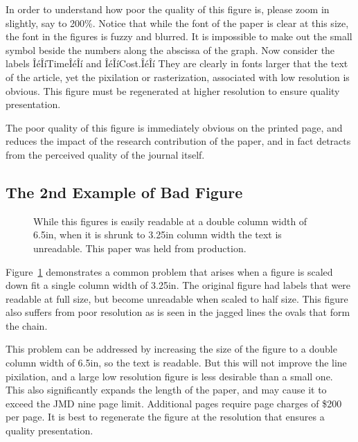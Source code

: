 \documentclass[12pt]{asme2ej}
\begin{document}
    In order to understand how poor the quality of this figure is, please zoom in slightly, say to 200\%. Notice that while the font of the paper is clear at this size, the font in the figures is fuzzy and blurred. It is impossible to make out the small symbol beside the numbers along the abscissa of the graph. Now consider the labels ÎéÎíTimeÎéÎí and ÎéÎíCost.ÎéÎí They are clearly in fonts larger that the text of the article, yet the pixilation or rasterization, associated with low resolution is obvious. This figure must be regenerated at higher resolution to ensure quality presentation.

    The poor quality of this figure is immediately obvious on the printed page, and reduces the impact of the research contribution of the paper, and in fact detracts from the perceived quality of the journal itself.



    \subsection{The 2nd Example of Bad Figure}

    \begin{figure}
        \centerline{}
        \caption{While this figures is easily readable at a double column width of 6.5in, when it is shrunk to 3.25in column width the text is unreadable. This paper was held from production.}
        \label{fig_example2.ps}
    \end{figure}

    Figure~\ref{fig_example2.ps}
    demonstrates a common problem that arises when a figure is scaled down fit a single column width of 3.25in. The original figure had labels that were readable at full size, but become unreadable when scaled to half size. This figure also suffers from poor resolution as is seen in the jagged lines the ovals that form the chain.

    This problem can be addressed by increasing the size of the figure to a double column width of 6.5in, so the text is readable. But this will not improve the line pixilation, and a large low resolution figure is less desirable than a small one. This also significantly expands the length of the paper, and may cause it to exceed the JMD nine page limit. Additional pages require page charges of \$200 per page. It is best to regenerate the figure at the resolution that ensures a quality presentation.
\end{document}
